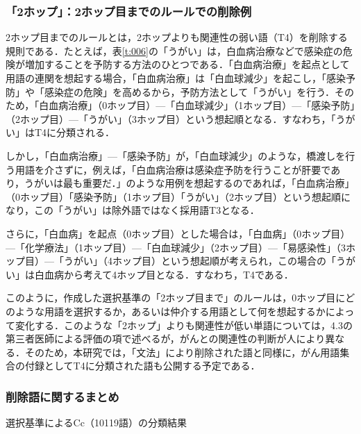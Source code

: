 \documentclass[japanese]{jnlp_1.4}
\begin{document}
\subsubsection{「2ホップ」：2ホップ目までのルールでの削除例}
\label{s:「2ホップ」：2ホップ目までのルールでの削除例}

2ホップ目までのルールとは，2ホップよりも関連性の弱い語（T4）を削除する規則である．たとえば，表\ref{t:006}の「うがい」は，白血病治療などで感染症の危険が増加することを予防する方法のひとつである．「白血病治療」を起点として用語の連関を想起する場合，「白血病治療」は「白血球減少」を起こし，「感染予防」や「感染症の危険」を高めるから，予防方法として「うがい」を行う．そのため，「白血病治療」（0ホップ目）—「白血球減少」（1ホップ目）—「感染予防」（2ホップ目）—「うがい」（3ホップ目）という想起順となる．すなわち，「うがい」はT4に分類される．

しかし，「白血病治療」—「感染予防」が，「白血球減少」のような，橋渡しを行う用語を介さずに，例えば，「白血病治療は感染症予防を行うことが肝要であり，うがいは最も重要だ．」のような用例を想起するのであれば，「白血病治療」（0ホップ目）「感染予防」（1ホップ目）「うがい」（2ホップ目）という想起順になり，この「うがい」は除外語ではなく採用語T3となる．

さらに，「白血病」を起点（0ホップ目）とした場合は，「白血病」（0ホップ目）—「化学療法」（1ホップ目）—「白血球減少」（2ホップ目）—「易感染性」（3ホップ目）—「うがい」（4ホップ目）という想起順が考えられ，この場合の「うがい」は白血病から考えて4ホップ目となる．すなわち，T4である．

このように，作成した選択基準の「2ホップ目まで」のルールは，0ホップ目にどのような用語を選択するか，あるいは仲介する用語として何を想起するかによって変化する．このような「2ホップ」よりも関連性が低い単語については，4.3の第三者医師による評価の項で述べるが，がんとの関連性の判断が人により異なる．そのため，本研究では，「文法」により削除された語と同様に，がん用語集合の付録としてT4に分類された語も公開する予定である．


\subsubsection{削除語に関するまとめ}
\label{s:削除語に関するまとめ}

\begin{table}[b]
 \caption{選択基準によるCc（10119語）の分類結果}
 \begin{center}

 \end{center}
 \label{t:007}
\end{table}
\end{document}
